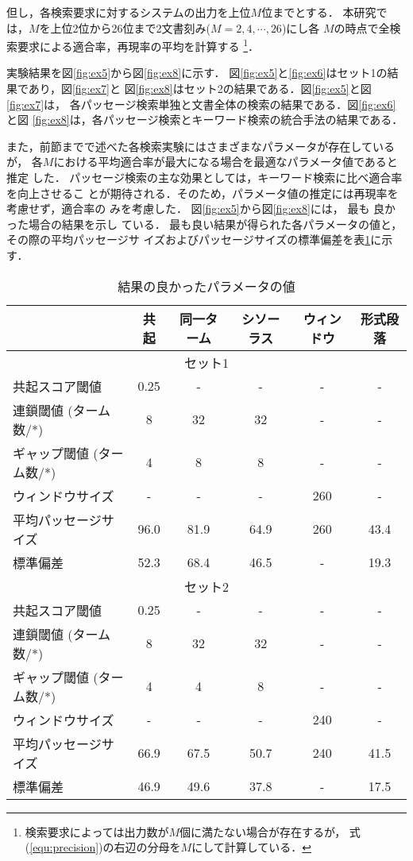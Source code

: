 但し，各検索要求に対するシステムの出力を上位$M$位までとする．
本研究では，$M$を上位2位から26位まで2文書刻み($M=2, 4, \cdots, 26$)にし各
$M$の時点で全検索要求による適合率，再現率の平均を計算する
\footnote{検索要求によっては出力数が$M$個に満たない場合が存在するが，
式(\ref{equ:precision})の右辺の分母を$M$にして計算している．}．

実験結果を図\ref{fig:ex5}から図\ref{fig:ex8}に示す．
図\ref{fig:ex5}と\ref{fig:ex6}はセット1の結果であり，図\ref{fig:ex7}と
図\ref{fig:ex8}はセット2の結果である．図\ref{fig:ex5}と図\ref{fig:ex7}は，
各パッセージ検索単独と文書全体の検索の結果である．図\ref{fig:ex6}と図
\ref{fig:ex8}は，各パッセージ検索とキーワード検索の統合手法の結果である．

また，前節までで述べた各検索実験にはさまざまなパラメータが存在しているが，
各$M$における平均適合率が最大になる場合を最適なパラメータ値であると推定
した．
パッセージ検索の主な効果としては，キーワード検索に比べ適合率を向上させるこ
とが期待される．そのため，パラメータ値の推定には再現率を考慮せず，適合率の
みを考慮した．
図\ref{fig:ex5}から図\ref{fig:ex8}には，
最も
良かった場合の結果を示し
ている．
最も良い結果が得られた各パラメータの値と，その際の平均パッセージサ
イズおよびパッセージサイズの標準偏差を表\ref{tab:bestparam}に示す．

\begin{table}[htbp]
\begin{center}
\caption{結果の良かったパラメータの値}\label{tab:bestparam}
\begin{tabular}{lccccc}\hline
			& 共起 & {\small 同一ターム} &{\small シソーラス}& {\small ウィンドウ} & {\small 形式段落}
\\\hline
\multicolumn{6}{c}{セット1}\\\hline
共起スコア閾値		& 0.25 &  -   &   -	 & -	  & -\\
連鎖閾値 {\small (ターム数/*)}	& 8    & 32   &  32	 & -	  & -\\
ギャップ閾値 {\small (ターム数/*)}& 4    &  8   &   8	 & -	  & -\\
ウィンドウサイズ      & -  & -    &-      &       260     &- \\\hline
平均パッセージサイズ	& 96.0 & 81.9 & 64.9     & 260    & 43.4\\
標準偏差		& 52.3 & 68.4 & 46.5	 & -	  & 19.3\\
\hline\hline
\multicolumn{6}{c}{セット2}\\\hline
共起スコア閾値		& 0.25 &  -   &   -	 & -	  & -\\
連鎖閾値 {\small (ターム数/*)}	& 8    & 32   &  32	 & -	  & -\\
ギャップ閾値 {\small (ターム数/*)} & 4    &  4   &   8	 & -	  & -\\
ウィンドウサイズ        & -    &  -   &   -      & 240    & -\\\hline
平均パッセージサイズ	& 66.9 & 67.5 & 50.7     & 240    & 41.5\\
標準偏差		& 46.9 & 49.6 & 37.8   	 & - 	  & 17.5\\\hline
\end{tabular}
\end{center}
\end{table}


